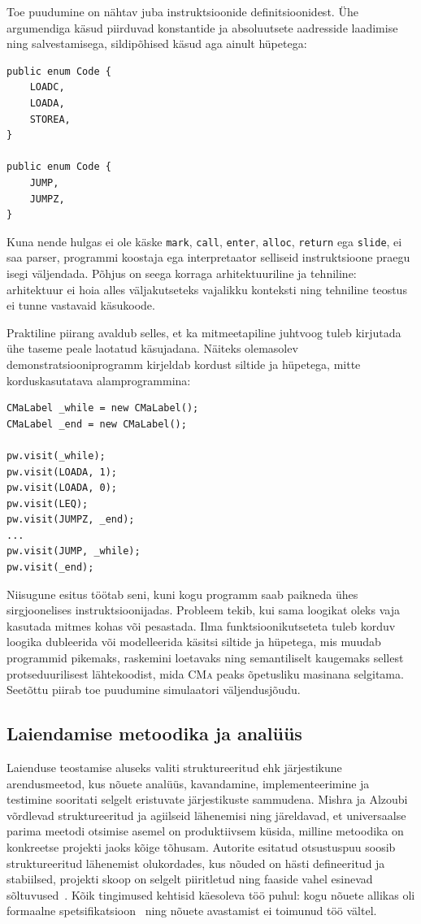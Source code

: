 Toe puudumine on nähtav juba instruktsioonide definitsioonidest. Ühe argumendiga käsud piirduvad konstantide ja absoluutsete aadresside laadimise ning salvestamisega, sildipõhised käsud aga ainult hüpetega:

\begin{verbatim}
public enum Code {
	LOADC,
	LOADA,
	STOREA,
}

public enum Code {
	JUMP,
	JUMPZ,
}
\end{verbatim}

Kuna nende hulgas ei ole käske \texttt{mark}, \texttt{call}, \texttt{enter}, \texttt{alloc}, \texttt{return} ega \texttt{slide}, ei saa parser, programmi koostaja ega interpretaator selliseid instruktsioone praegu isegi väljendada. Põhjus on seega korraga arhitektuuriline ja tehniline: arhitektuur ei hoia alles väljakutseteks vajalikku konteksti ning tehniline teostus ei tunne vastavaid käsukoode.

Praktiline piirang avaldub selles, et ka mitmeetapiline juhtvoog tuleb kirjutada ühe taseme peale laotatud käsujadana. Näiteks olemasolev demonstratsiooniprogramm kirjeldab kordust siltide ja hüpetega, mitte korduskasutatava alamprogrammina:

\begin{verbatim}
CMaLabel _while = new CMaLabel();
CMaLabel _end = new CMaLabel();

pw.visit(_while);
pw.visit(LOADA, 1);
pw.visit(LOADA, 0);
pw.visit(LEQ);
pw.visit(JUMPZ, _end);
...
pw.visit(JUMP, _while);
pw.visit(_end);
\end{verbatim}

Niisugune esitus töötab seni, kuni kogu programm saab paikneda ühes sirgjoonelises instruktsioonijadas. Probleem tekib, kui sama loogikat oleks vaja kasutada mitmes kohas või pesastada. Ilma funktsioonikutseteta tuleb korduv loogika dubleerida või modelleerida käsitsi siltide ja hüpetega, mis muudab programmid pikemaks, raskemini loetavaks ning semantiliselt kaugemaks sellest protseduurilisest lähtekoodist, mida \textsc{CMa} peaks õpetusliku masinana selgitama. Seetõttu piirab toe puudumine simulaatori väljendusjõudu.

\subsection{Laiendamise metoodika ja analüüs}\label{implementatsioon:metoodika}

Laienduse teostamise aluseks valiti struktureeritud ehk järjestikune arendusmeetod, kus nõuete analüüs, kavandamine, implementeerimine ja testimine sooritati selgelt eristuvate järjestikuste sammudena. Mishra ja Alzoubi~\cite{mishra_structured_2023} võrdlevad struktureeritud ja agiilseid lähenemisi ning järeldavad, et universaalse parima meetodi otsimise asemel on produktiivsem küsida, milline metoodika on konkreetse projekti jaoks kõige tõhusam. Autorite esitatud otsustuspuu soosib struktureeritud lähenemist olukordades, kus nõuded on hästi defineeritud ja stabiilsed, projekti skoop on selgelt piiritletud ning faaside vahel esinevad sõltuvused~\cite{mishra_structured_2023}. Kõik tingimused kehtisid käesoleva töö puhul: kogu nõuete allikas oli formaalne spetsifikatsioon~\cite{wilhelm_imperative_2010} ning nõuete avastamist ei toimunud töö vältel.

